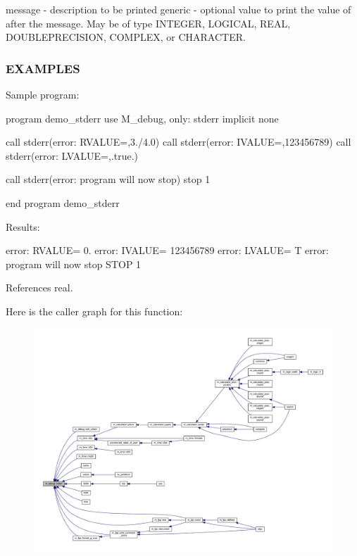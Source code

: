 message -\/ description to be printed generic -\/ optional value to print the value of after the message. May be of type I\+N\+T\+E\+G\+ER, L\+O\+G\+I\+C\+AL, R\+E\+AL, D\+O\+U\+B\+L\+E\+P\+R\+E\+C\+I\+S\+I\+ON, C\+O\+M\+P\+L\+EX, or C\+H\+A\+R\+A\+C\+T\+ER. \subsubsection*{E\+X\+A\+M\+P\+L\+ES}

Sample program\+:

program demo\+\_\+stderr use M\+\_\+debug, only\+: stderr implicit none

call stderr(\textquotesingle{}error\+: R\+V\+A\+L\+UE=\textquotesingle{},3./4.0) call stderr(\textquotesingle{}error\+: I\+V\+A\+L\+UE=\textquotesingle{},123456789) call stderr(\textquotesingle{}error\+: L\+V\+A\+L\+UE=\textquotesingle{},.true.)

call stderr(\textquotesingle{}error\+: program will now stop\textquotesingle{}) stop 1

end program demo\+\_\+stderr

Results\+:

error\+: R\+V\+A\+L\+UE= 0. error\+: I\+V\+A\+L\+UE= 123456789 error\+: L\+V\+A\+L\+UE= T error\+: program will now stop S\+T\+OP 1 

References real.

Here is the caller graph for this function\+:
\nopagebreak
\begin{figure}[H]
\begin{center}
\leavevmode
\includegraphics[width=350pt]{namespacem__debug_ad59ade4de861dcf4e007521b2cf2f304_icgraph}
\end{center}
\end{figure}
\mbox{\label{namespacem__debug_a0ae797092ab85a8ba9258dc9f8949189}} 
